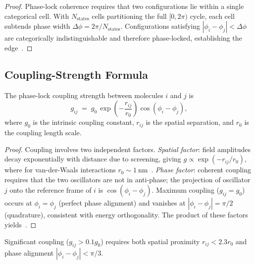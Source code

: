 \begin{proof}
Phase-lock coherence requires that two configurations lie within a single
categorical cell.  With $N_{\mathrm{states}}$ cells partitioning the full
$[0,2\pi)$ cycle, each cell subtends phase width
$\Delta\phi=2\pi/N_{\mathrm{states}}$.  Configurations satisfying
$|\phi_i-\phi_j|<\Delta\phi$ are categorically indistinguishable and therefore
phase-locked, establishing the edge~\citep{kuramoto1984chemical}.
\end{proof}

\subsection{Coupling-Strength Formula}

\begin{theorem}
\label{thm:ch03-coupling-strength}
The phase-lock coupling strength between molecules $i$ and $j$ is
\begin{equation}
    g_{ij} \;=\; g_0\,\exp\!\left(-\frac{r_{ij}}{r_0}\right)
               \cos(\phi_i-\phi_j),
    \label{eq:ch03-coupling-strength}
\end{equation}
where $g_0$ is the intrinsic coupling constant, $r_{ij}$ is the spatial
separation, and $r_0$ is the coupling length scale.
\end{theorem}

\begin{proof}
Coupling involves two independent factors.
\emph{Spatial factor}: field amplitudes decay exponentially with distance due
to screening, giving $g\propto\exp(-r_{ij}/r_0)$, where for van-der-Waals
interactions $r_0\sim 1~\mathrm{nm}$~\citep{israelachvili2011intermolecular}.
\emph{Phase factor}: coherent coupling requires that the two oscillators are
not in anti-phase; the projection of oscillator $j$ onto the reference frame
of $i$ is $\cos(\phi_i-\phi_j)$.  Maximum coupling ($g_{ij}=g_0$) occurs at
$\phi_i=\phi_j$ (perfect phase alignment) and vanishes at
$|\phi_i-\phi_j|=\pi/2$ (quadrature), consistent with energy orthogonality.
The product of these factors yields~.
\end{proof}

\begin{corollary}
Significant coupling ($g_{ij}>0.1g_0$) requires both spatial proximity
$r_{ij}<2.3r_0$ and phase alignment $|\phi_i-\phi_j|<\pi/3$.
\end{corollary}

